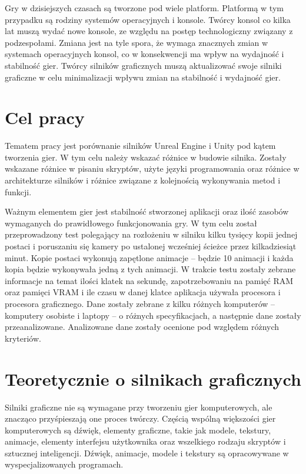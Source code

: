 \documentclass[12pt,twoside]{article}
\begin{document}
Gry w dzisiejszych czasach są tworzone pod wiele platform. Platformą w tym
przypadku są rodziny systemów operacyjnych i konsole. Twórcy konsol co kilka lat
muszą wydać nowe konsole, ze względu na postęp technologiczny związany z
podzespołami. Zmiana jest na tyle spora, że wymaga znacznych zmian w systemach
operacyjnych konsol, co w konsekwencji ma wpływ na wydajność i stabilność gier.
Twórcy silników graficznych muszą aktualizować swoje silniki graficzne w celu
minimalizacji wpływu zmian na stabilność i wydajność gier. 



\clearpage

\section{Cel pracy}

Tematem pracy jest porównanie silników Unreal Engine i Unity pod kątem tworzenia
gier.  W tym celu należy wskazać różnice w budowie silnika. Zostały wskazane
różnice w pisaniu skryptów,  użyte języki programowania oraz różnice w
architekturze silników i różnice związane z kolejnością wykonywania metod i
funkcji. 


Ważnym elementem gier jest stabilność stworzonej aplikacji oraz ilość zasobów
wymaganych do prawidłowego funkcjonowania gry. W tym celu został przeprowadzony
test polegający na rozłożeniu w silniku kilku tysięcy kopii jednej postaci i
poruszaniu się kamery po ustalonej wcześniej ścieżce przez kilkadziesiąt minut.
Kopie postaci wykonują zapętlone animacje -- będzie 10 animacji i każda kopia
będzie wykonywała jedną z tych animacji. W trakcie testu zostały zebrane
informacje na temat ilości klatek na sekundę, zapotrzebowaniu na pamięć RAM oraz
pamięci VRAM i ile czasu w danej klatce aplikacja używała procesora i procesora
graficznego. Dane zostały zebrane z kilku różnych komputerów -- komputery
osobiste i laptopy -- o różnych specyfikacjach, a następnie dane zostały
przeanalizowane. Analizowane dane zostały ocenione pod względem różnych
kryteriów.



\clearpage


\section{Teoretycznie o silnikach graficznych}

Silniki graficzne nie są wymagane przy tworzeniu gier komputerowych, ale
znacząco przyśpieszają one proces twórczy. Częścią wspólną większości gier
komputerowych są dźwięk, elementy graficzne, takie jak modele, tekstury,
animacje, elementy interfejsu użytkownika oraz wszelkiego rodzaju skryptów i
sztucznej inteligencji. Dźwięk, animacje, modele i tekstury są opracowywane w
wyspecjalizowanych programach. 
\end{document}
